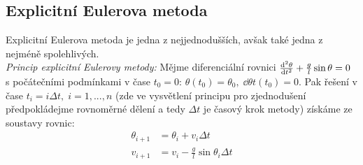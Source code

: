 \documentclass[reqno, a4paper]{amsart}
\begin{document}
\subsection{Explicitní Eulerova metoda}
Explicitní Eulerova metoda je jedna z nejjednodušších, avšak také jedna z nejméně spolehlivých.
\\
\textit{Princip explicitní Eulerovy metody:} Mějme diferenciální rovnici $\frac{\mathrm{d}^2 {\theta}}{\mathrm{d} {t}^2} + \frac{g}{l} \sin \theta = 0$ s počátečními podmínkami v čase $t_{0}=0$: $\theta(t_{0})=\theta_{0},\; \dd{\theta}{t}(t_{0})=0$. Pak řešení v čase $t_{i}=i\Delta t,\; i=1,...,n$ (zde ve vysvětlení principu pro zjednodušení předpokládejme rovnoměrné dělení a tedy $ \Delta t$ je časový krok metody) získáme ze soustavy rovnic: 
\begin{align}
	\theta_{i+1}& =\theta_{i}+v_{i}\Delta t\\
	v_{i+1}& =v_{i}-\frac{g}{l}\sin\theta_{i}\Delta t
\end{align}
\end{document}
